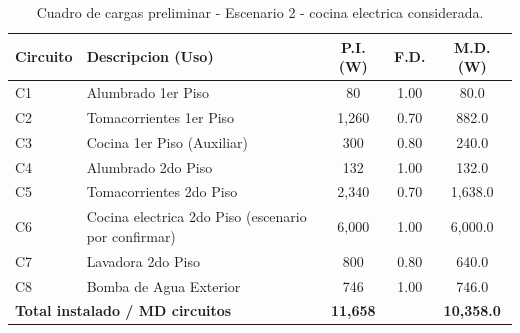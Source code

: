 \begin{table}[H]
\centering
\caption{Cuadro de cargas preliminar - Escenario 2 - cocina electrica considerada.}
\label{tab:cuadro-cargas-cocina-electrica-preliminar}
\begin{small}
\begin{tabular}{l l c c c}
\toprule
\textbf{Circuito} & \textbf{Descripcion (Uso)} & \textbf{P.I. (W)} & \textbf{F.D.} & \textbf{M.D. (W)} \\
\midrule
C1 & Alumbrado 1er Piso & 80 & 1.00 & 80.0 \\
C2 & Tomacorrientes 1er Piso & 1,260 & 0.70 & 882.0 \\
C3 & Cocina 1er Piso (Auxiliar) & 300 & 0.80 & 240.0 \\
C4 & Alumbrado 2do Piso & 132 & 1.00 & 132.0 \\
C5 & Tomacorrientes 2do Piso & 2,340 & 0.70 & 1,638.0 \\
C6 & Cocina electrica 2do Piso (escenario por confirmar) & 6,000 & 1.00 & 6,000.0 \\
C7 & Lavadora 2do Piso & 800 & 0.80 & 640.0 \\
C8 & Bomba de Agua Exterior & 746 & 1.00 & 746.0 \\
\midrule
\multicolumn{2}{l}{\textbf{Total instalado / MD circuitos}} & \textbf{11,658} & & \textbf{10,358.0} \\
\bottomrule
\end{tabular}
\end{small}
\end{table}